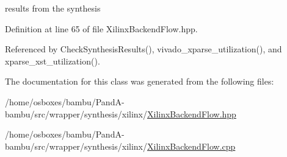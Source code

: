 results from the synthesis 



Definition at line 65 of file Xilinx\+Backend\+Flow.\+hpp.



Referenced by Check\+Synthesis\+Results(), vivado\+\_\+xparse\+\_\+utilization(), and xparse\+\_\+xst\+\_\+utilization().



The documentation for this class was generated from the following files\+:\begin{DoxyCompactItemize}
\item 
/home/osboxes/bambu/\+Pand\+A-\/bambu/src/wrapper/synthesis/xilinx/\hyperlink{XilinxBackendFlow_8hpp}{Xilinx\+Backend\+Flow.\+hpp}\item 
/home/osboxes/bambu/\+Pand\+A-\/bambu/src/wrapper/synthesis/xilinx/\hyperlink{XilinxBackendFlow_8cpp}{Xilinx\+Backend\+Flow.\+cpp}\end{DoxyCompactItemize}
